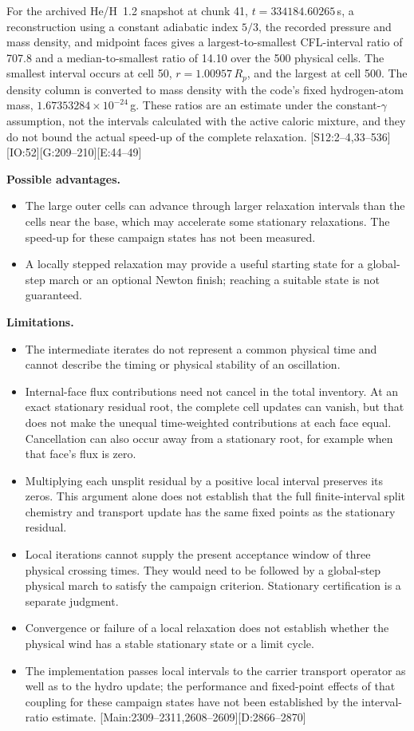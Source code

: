 \documentclass[english,a4paper]{my_memo}
\newcommand{\ev}[2]{\textnormal{\small[#1:#2]}}
\begin{document}
For the archived He/H~1.2 snapshot at chunk 41,
$t=334184.60265$\,s, a reconstruction using a constant adiabatic index
$5/3$, the recorded pressure and mass density, and midpoint faces gives a
largest-to-smallest CFL-interval ratio of 707.8 and a median-to-smallest
ratio of 14.10 over the 500 physical cells. The smallest interval occurs at
cell 50, $r=1.00957\,R_p$, and the largest at cell 500. The density column
is converted to mass density with the code's fixed hydrogen-atom mass,
$1.67353284\times10^{-24}$\,g. These ratios are an estimate under the
constant-$\gamma$ assumption, not the intervals calculated with the active
caloric mixture, and they do not bound the actual speed-up of the complete
relaxation. \ev{S12}{2--4,33--536}\ev{IO}{52}\ev{G}{209--210}\ev{E}{44--49}

\textbf{Possible advantages.}
\begin{itemize}
\item The large outer cells can advance through larger relaxation intervals
than the cells near the base, which may accelerate some stationary
relaxations. The speed-up for these campaign states has not been measured.
\item A locally stepped relaxation may provide a useful starting state for
a global-step march or an optional Newton finish; reaching a suitable state
is not guaranteed.
\end{itemize}

\textbf{Limitations.}
\begin{itemize}
\item The intermediate iterates do not represent a common physical time and
cannot describe the timing or physical stability of an oscillation.
\item Internal-face flux contributions need not cancel in the total
inventory. At an exact stationary residual root, the complete cell updates
can vanish, but that does not make the unequal time-weighted contributions
at each face equal. Cancellation can also occur away from a stationary root,
for example when that face's flux is zero.
\item Multiplying each unsplit residual by a positive local interval
preserves its zeros. This argument alone does not establish that the full
finite-interval split chemistry and transport update has the same fixed
points as the stationary residual.
\item Local iterations cannot supply the present acceptance window of three
physical crossing times. They would need to be followed by a global-step
physical march to satisfy the campaign criterion. Stationary certification
is a separate judgment.
\item Convergence or failure of a local relaxation does not establish whether
the physical wind has a stable stationary state or a limit cycle.
\item The implementation passes local intervals to the carrier transport
operator as well as to the hydro update; the performance and fixed-point
effects of that coupling for these campaign states have not been established
by the interval-ratio estimate. \ev{Main}{2309--2311,2608--2609}\ev{D}{2866--2870}
\end{itemize}
\end{document}
